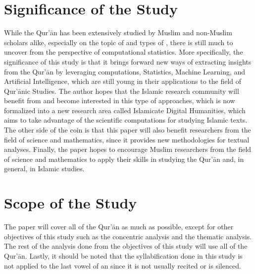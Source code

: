 \section{Significance of the Study}\label{sec:significance}
While the Qur'\=an has been extensively studied by Muslim and non-Muslim scholars alike, especially on the topic of   and   types of  , there is still much to uncover from the perspective of computational statistics. More specifically, the significance of this study is that it brings forward new ways of extracting insights from the Qur'\=an by leveraging computations, Statistics, Machine Learning, and Artificial Intelligence, which are still young in their applications to the field of Qur'\=anic Studies. The author hopes that the Islamic research community will benefit from and become interested in this type of approaches, which is now formalized into a new research area called Islamicate Digital Humanities, which aims to take advantage of the scientific computations for studying Islamic texts. The other side of the coin is that this paper will also benefit researchers from the field of science and mathematics, since it provides new methodologies for textual analyses. Finally, the paper hopes to encourage Muslim researchers from the field of science and mathematics to apply their skills in studying the Qur'\=an and, in general, in Islamic studies.

\section{Scope of the Study}
The paper will cover all   of the Qur'\=an as much as possible, except for other objectives of this study such as the concentric analysis and the thematic analysis. The rest of the analysis done from the objectives of this study will use all   of the Qur'\=an. Lastly, it should be noted that the syllabification done in this study is not applied to the last vowel of an   since it is not usually recited or is silenced.
